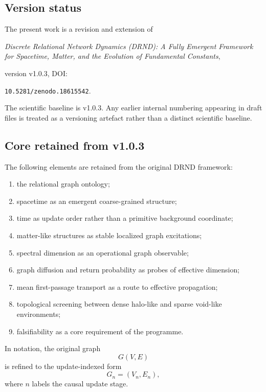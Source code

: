 \documentclass[12pt]{iopart}
\begin{document}
\subsection{Version status}

The present work is a revision and extension of
\begin{center}
\textit{Discrete Relational Network Dynamics (DRND): A Fully Emergent Framework for Spacetime, Matter, and the Evolution of Fundamental Constants},
\end{center}
version v1.0.3, DOI:
\begin{center}
\texttt{10.5281/zenodo.18615542}.
\end{center}
The scientific baseline is v1.0.3. Any earlier internal numbering appearing in draft files is treated as a versioning artefact rather than a distinct scientific baseline.

\subsection{Core retained from v1.0.3}

The following elements are retained from the original DRND framework:
\begin{enumerate}
    \item the relational graph ontology;
    \item spacetime as an emergent coarse-grained structure;
    \item time as update order rather than a primitive background coordinate;
    \item matter-like structures as stable localized graph excitations;
    \item spectral dimension as an operational graph observable;
    \item graph diffusion and return probability as probes of effective dimension;
    \item mean first-passage transport as a route to effective propagation;
    \item topological screening between dense halo-like and sparse void-like environments;
    \item falsifiability as a core requirement of the programme.
\end{enumerate}

In notation, the original graph
\begin{equation}
G(V,E)
\end{equation}
is refined to the update-indexed form
\begin{equation}
G_n=(V_n,E_n),
\end{equation}
where \(n\) labels the causal update stage.
\end{document}
